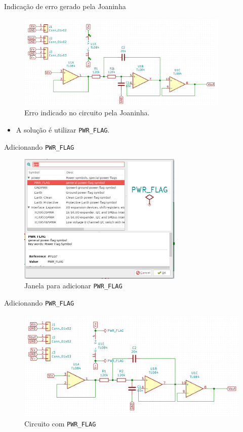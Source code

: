 \documentclass{beamer}
\begin{document}
\begin{frame}{Indicação de erro gerado pela Joaninha}
	\begin{figure}
		\centering
		\includegraphics[width=0.9\textwidth]{Imagens/11_erro_no_circuito.png}
		\caption{Erro indicado no circuito pela Joaninha.}
	\end{figure}
	\pause
	\begin{itemize}
		\item A solução é utilizar \texttt{PWR\_FLAG}.
	\end{itemize}
\end{frame}

\begin{frame}{Adicionando \texttt{PWR\_FLAG}}
	\begin{figure}
		\centering
		\includegraphics[width=0.7\textwidth]{Imagens/12_add_pwr_flag.png}
		\caption{Janela para adicionar \texttt{PWR\_FLAG}}
	\end{figure}
\end{frame}

\begin{frame}{Adicionando \texttt{PWR\_FLAG}}
	\begin{figure}
		\centering
		\includegraphics[width=1.0\textwidth]{Imagens/13_circ_com_pwr_flag.png}
		\caption{Circuito com \texttt{PWR\_FLAG}}
	\end{figure}
\end{frame}
\end{document}
